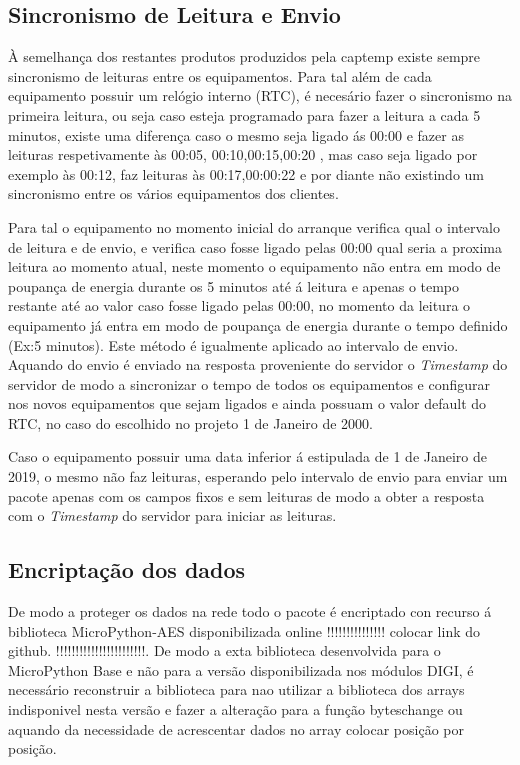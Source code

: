 \subsection {Sincronismo de Leitura e Envio} 

\par À semelhança dos restantes produtos produzidos pela captemp existe sempre sincronismo de leituras entre os equipamentos. Para tal além de cada equipamento possuir um relógio interno (RTC), é necesário fazer o sincronismo na primeira leitura, ou seja caso esteja programado para fazer a leitura a cada 5 minutos, existe uma diferença caso o mesmo seja ligado ás 00:00 e fazer as leituras respetivamente às 00:05, 00:10,00:15,00:20 , mas caso seja ligado por exemplo às 00:12, faz leituras às 00:17,00:00:22 e por diante não existindo um sincronismo entre os vários equipamentos dos clientes.
\par Para tal o equipamento no momento inicial do arranque verifica qual o intervalo de leitura e de envio, e verifica caso fosse ligado pelas 00:00 qual seria a proxima leitura ao momento atual, neste momento o equipamento não entra em modo de poupança de energia durante os 5 minutos até á leitura e apenas o tempo restante até ao valor caso fosse ligado pelas 00:00, no momento da leitura o equipamento já entra em modo de poupança de energia durante o tempo definido (Ex:5 minutos). Este método é igualmente aplicado ao intervalo de envio. Aquando do envio é enviado na resposta proveniente do servidor o \textit{Timestamp} do servidor de modo a sincronizar o tempo de todos os equipamentos e configurar nos novos equipamentos que sejam ligados e ainda possuam o valor default do RTC, no caso do escolhido no projeto 1 de Janeiro de 2000.
\par Caso o equipamento possuir uma data inferior á estipulada de 1 de Janeiro de 2019, o mesmo não faz leituras, esperando pelo intervalo de envio para enviar um pacote apenas com os campos fixos e sem leituras de modo a obter a resposta com o \textit{Timestamp} do servidor para iniciar as leituras.


\subsection {Encriptação dos dados}

\par De modo a proteger os dados na rede todo o pacote é encriptado con recurso á biblioteca MicroPython-AES disponibilizada online !!!!!!!!!!!!!!! colocar link do github. !!!!!!!!!!!!!!!!!!!!!!!. De modo a exta biblioteca desenvolvida para o MicroPython Base e não para a versão disponibilizada nos módulos DIGI, é necessário reconstruir a biblioteca para nao utilizar a biblioteca dos arrays  indisponivel nesta versão e fazer a alteração para a função byteschange ou aquando da necessidade de acrescentar dados no array colocar posição por posição. 


